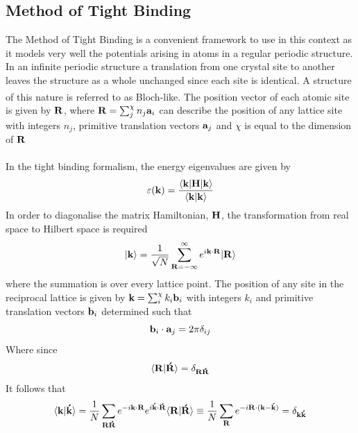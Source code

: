 \documentclass[a4paper, 12pt]{article}
\begin{document}
	\subsection{Method of Tight Binding}
	The Method of Tight Binding is a convenient framework to use in this context as it models very well the potentials arising in atoms in a regular periodic structure. 
	In an infinite periodic structure a translation from one crystal site to another leaves the structure as a whole unchanged since each site is identical. A structure of this nature is referred to as Bloch-like\textsuperscript{\textcolor{blue}{\cite{kittel_1996}}}.
	The position vector of each atomic site is given by $\bf R$,
		where ${\bf R} = \sum_j^\chi n_j{\bf a}_i$ can describe the position of any lattice site with integers $n_j$, primitive translation vectors ${\bf a}_j$ and $\chi$ is equal to the dimension of $\bf R$ \\ 
		\\In the tight binding formalism, the energy eigenvalues are given by 
		\begin{equation}
			\varepsilon({\bf k}) = \frac{\langle {\bf k}|{\bf H}|{\bf k} \rangle}{\langle\bf k|k\rangle}
		\end{equation}
		In order to diagonalise the matrix Hamiltonian, $\bf H$, the transformation from real space to Hilbert space is required
		\begin{equation}\label{kkk}
			|{\bf k}\rangle = \frac{1}{\sqrt{N}}\sum_{\bf R = -\infty}^\infty e^{i{\bf k}\cdot \bf R} |\bf R\rangle
		\end{equation}
		where the summation is over every lattice point. The position of any site in the reciprocal lattice is given by ${\bf k} = \sum_i^\chi k_i{\bf b}_i$ with integers $k_i$ and primitive translation vectors ${\bf b}_i$ determined such that 
		\begin{equation}
		{\bf b}_i\cdot {\bf a}_j = 2\pi \delta_{i j}
			\label{ab}
		\end{equation}
Where since 
		\begin{equation}
			\langle{\bf R}|{\bf \acute{R}}\rangle = \delta_{\bf R \acute{R}}
		\end{equation}
		It follows that
		\begin{equation}
			\label{kk}
			\langle{\bf k}|{\bf \acute{k}}\rangle = \frac{1}{N}\sum_{\bf R \acute{R}} e^{-i{\bf k}\cdot{\bf R}}e^{i{\bf \acute{k}}\cdot{\bf \acute{R}}} \langle{\bf R | \acute{R}}\rangle \equiv \frac{1}{N}\sum_{\bf R} e^{-i{\bf R\cdot(k-\acute{k})}}=\delta_{\bf k \acute{k}}
		\end{equation}
\end{document}
